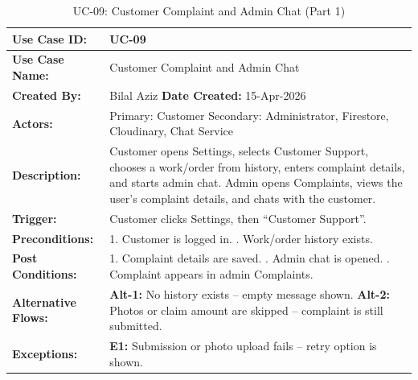 {\footnotesize
\setlength{\tabcolsep}{3pt}
\renewcommand{\arraystretch}{0.9}
\begin{table}[H]
\centering
\begin{tabular}{|p{2.7cm}|p{12.1cm}|}
\hline
\textbf{Use Case ID:} & UC-09 \\ \hline
\textbf{Use Case Name:} & Customer Complaint and Admin Chat \\ \hline
\textbf{Created By:} & Bilal Aziz \hfill \textbf{Date Created:} 15-Apr-2026 \\ \hline
\textbf{Actors:} & Primary: Customer \quad Secondary: Administrator, Firestore, Cloudinary, Chat Service \\ \hline
\textbf{Description:} & Customer opens Settings, selects Customer Support, chooses a work/order from history, enters complaint details, and starts admin chat. Admin opens Complaints, views the user's complaint details, and chats with the customer. \\ \hline
\textbf{Trigger:} & Customer clicks Settings, then ``Customer Support''. \\ \hline
\textbf{Preconditions:} & 1. Customer is logged in. \newline 2. Work/order history exists. \\ \hline
\textbf{Post Conditions:} & 1. Complaint details are saved. \newline 2. Admin chat is opened. \newline 3. Complaint appears in admin Complaints. \\ \hline
\textbf{Alternative Flows:} & \textbf{Alt-1:} No history exists -- empty message shown. \newline \textbf{Alt-2:} Photos or claim amount are skipped -- complaint is still submitted. \\ \hline
\textbf{Exceptions:} & \textbf{E1:} Submission or photo upload fails -- retry option is shown. \\ \hline
\end{tabular}
\caption*{UC-09: Customer Complaint and Admin Chat (Part 1)}
\end{table}
}

\newpage

